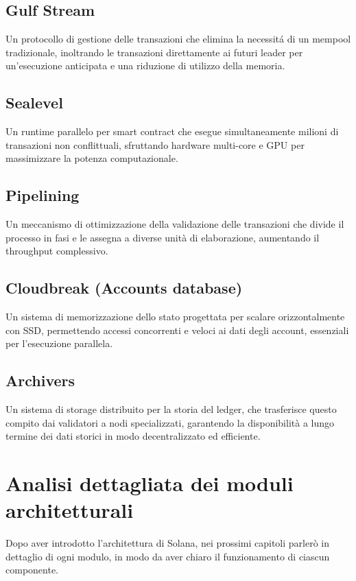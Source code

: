 \documentclass[a4paper,12pt]{report}
\begin{document}
	\section{Gulf Stream}
	Un protocollo di gestione delle transazioni che elimina la necessitá di un mempool tradizionale, inoltrando le transazioni direttamente ai futuri leader per un'esecuzione anticipata e una riduzione di utilizzo della memoria.
	
	\section{Sealevel}
	Un runtime parallelo per smart contract che esegue simultaneamente milioni di transazioni non conflittuali, sfruttando hardware multi-core e GPU per massimizzare la potenza computazionale.
	
	\section{Pipelining}
	Un meccanismo di ottimizzazione della validazione delle transazioni che divide il processo in fasi e le assegna a diverse unità di elaborazione, aumentando il throughput complessivo.
	
	\section{Cloudbreak (Accounts database)}
	Un sistema di memorizzazione dello stato progettata per scalare orizzontalmente con SSD, permettendo accessi concorrenti e veloci ai dati degli account, essenziali per l'esecuzione parallela.
	
	\section{Archivers}
	Un sistema di storage distribuito per la storia del ledger, che trasferisce questo compito dai validatori a nodi specializzati, garantendo la disponibilità a lungo termine dei dati storici in modo decentralizzato ed efficiente.
	
	\chapter{Analisi dettagliata dei moduli architetturali}
	
	Dopo aver introdotto l'architettura di Solana, nei prossimi capitoli parlerò in dettaglio di ogni modulo, in modo da aver chiaro il funzionamento di ciascun componente.
	
\end{document}
